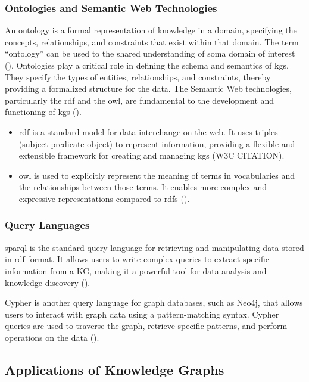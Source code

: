 \subsubsection*{Ontologies and Semantic Web Technologies}
An ontology is a formal representation of knowledge in a domain, specifying the concepts, relationships, and constraints that exist within that domain. The term ``ontology'' can be used to the shared understanding of soma domain of interest (\cite{Uschold1996}).
Ontologies play a critical role in defining the schema and semantics of \glspl{kg}. They specify the types of entities, relationships, and constraints, thereby providing a formalized structure for the data. The Semantic Web technologies, particularly the \gls{rdf} and the \gls{owl}, are fundamental to the development and functioning of \glspl{kg} (\cite{Antoniou2008}).
\begin{itemize}
    \item \gls{rdf} is a standard model for data interchange on the web. It uses triples (subject-predicate-object) to represent information, providing a flexible and extensible framework for creating and managing \glspl{kg} (W3C CITATION).
    \item \gls{owl} is used to explicitly represent the meaning of terms in vocabularies and the relationships between those terms. It enables more complex and expressive representations compared to \gls{rdfs} (\cite{Deborah2004}).
\end{itemize}
\subsubsection*{Query Languages}
\gls{sparql} is the standard query language for retrieving and manipulating data stored in \gls{rdf} format. It allows users to write complex queries to extract specific information from a KG, making it a powerful tool for data analysis and knowledge discovery (\cite{Jorge2009}).

Cypher is another query language for graph databases, such as Neo4j, that allows users to interact with graph data using a pattern-matching syntax. Cypher queries are used to traverse the graph, retrieve specific patterns, and perform operations on the data (\cite{Francis2018}).

\subsection*{Applications of Knowledge Graphs}

